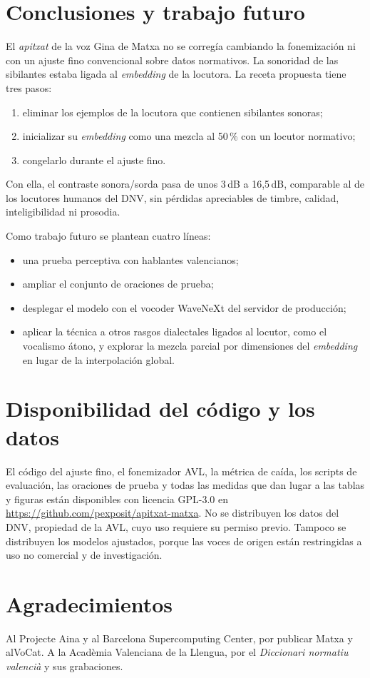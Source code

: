 \documentclass[conference]{IEEEtran}
\newcommand{\dB}{\,dB}
\begin{document}
\section{Conclusiones y trabajo futuro}

El \textit{apitxat} de la voz Gina de Matxa no se corregía cambiando la fonemización ni con un ajuste fino convencional sobre datos normativos. La sonoridad de las sibilantes estaba ligada al \textit{embedding} de la locutora. La receta propuesta tiene tres pasos:
\begin{enumerate}
\item eliminar los ejemplos de la locutora que contienen sibilantes sonoras;
\item inicializar su \textit{embedding} como una mezcla al 50\,\% con un locutor normativo;
\item congelarlo durante el ajuste fino.
\end{enumerate}
Con ella, el contraste sonora/sorda pasa de unos 3\dB{} a 16,5\dB, comparable al de los locutores humanos del DNV, sin pérdidas apreciables de timbre, calidad, inteligibilidad ni prosodia.

Como trabajo futuro se plantean cuatro líneas:
\begin{itemize}
\item una prueba perceptiva con hablantes valencianos;
\item ampliar el conjunto de oraciones de prueba;
\item desplegar el modelo con el vocoder WaveNeXt del servidor de producción;
\item aplicar la técnica a otros rasgos dialectales ligados al locutor, como el vocalismo átono, y explorar la mezcla parcial por dimensiones del \textit{embedding} en lugar de la interpolación global.
\end{itemize}

\section*{Disponibilidad del código y los datos}
El código del ajuste fino, el fonemizador AVL, la métrica de caída, los scripts de evaluación, las oraciones de prueba y todas las medidas que dan lugar a las tablas y figuras están disponibles con licencia GPL-3.0 en \url{https://github.com/pexposit/apitxat-matxa}. No se distribuyen los datos del DNV, propiedad de la AVL, cuyo uso requiere su permiso previo. Tampoco se distribuyen los modelos ajustados, porque las voces de origen están restringidas a uso no comercial y de investigación.

\section*{Agradecimientos}
Al Projecte Aina y al Barcelona Supercomputing Center, por publicar Matxa y alVoCat. A la Acadèmia Valenciana de la Llengua, por el \textit{Diccionari normatiu valencià} y sus grabaciones.



\end{document}

